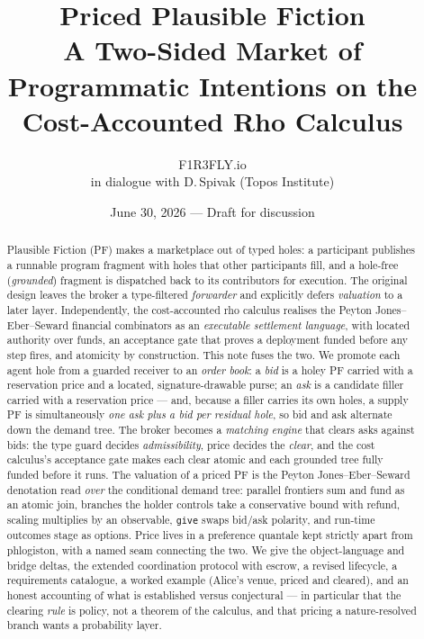 \documentclass[11pt]{article}
\title{\textbf{Priced Plausible Fiction}\\[2pt]
\large A Two-Sided Market of Programmatic Intentions on the\\
Cost-Accounted Rho Calculus}
\author{F1R3FLY.io \\ \small in dialogue with D.\,Spivak (Topos Institute)}
\date{June 30, 2026 --- Draft for discussion}
\theoremstyle{definition}
\newcommand{\PF}{\textsf{PF}}
\begin{document}
\maketitle

\begin{abstract}
Plausible Fiction (\PF) makes a marketplace out of typed holes: a participant publishes a
runnable program fragment with holes that other participants fill, and a hole-free (\emph{grounded})
fragment is dispatched back to its contributors for execution. The original design leaves the
broker a type-filtered \emph{forwarder} and explicitly defers \emph{valuation} to a later layer.
Independently, the cost-accounted rho calculus realises the Peyton Jones--Eber--Seward financial
combinators as an \emph{executable settlement language}, with located authority over funds, an
acceptance gate that proves a deployment funded before any step fires, and atomicity by
construction. This note fuses the two. We promote each agent hole from a guarded receiver to an
\emph{order book}: a \emph{bid} is a holey \PF{} carried with a reservation price and a located,
signature-drawable purse; an \emph{ask} is a candidate filler carried with a reservation price ---
and, because a filler carries its own holes, a supply \PF{} is simultaneously \emph{one ask plus a
bid per residual hole}, so bid and ask alternate down the demand tree. The broker becomes a
\emph{matching engine} that clears asks against bids: the type guard decides \emph{admissibility},
price decides the \emph{clear}, and the cost calculus's acceptance gate makes each clear atomic and
each grounded tree fully funded before it runs. The valuation of a priced \PF{} is the
Peyton Jones--Eber--Seward denotation read \emph{over} the conditional demand tree: parallel
frontiers sum and fund as an atomic join, branches the holder controls take a conservative bound
with refund, scaling multiplies by an observable, \texttt{give} swaps bid/ask polarity, and
run-time outcomes stage as options. Price lives in a preference quantale kept strictly apart from
phlogiston, with a named seam connecting the two. We give the object-language and bridge deltas, the
extended coordination protocol with escrow, a revised lifecycle, a requirements catalogue, a worked
example (Alice's venue, priced and cleared), and an honest accounting of what is established versus
conjectural --- in particular that the clearing \emph{rule} is policy, not a theorem of the calculus,
and that pricing a nature-resolved branch wants a probability layer.
\end{abstract}
\end{document}

